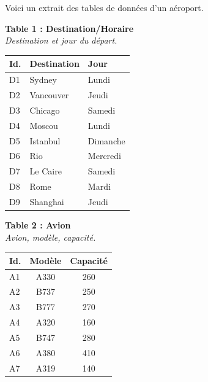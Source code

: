 \documentclass[class=report,crop=false, 12pt]{standalone}
\begin{document}
\begin{enigme}


Voici un extrait des tables de données d'un aéroport.

\bigskip

\begin{center}
{\small %

%
\begin{minipage}{0.35\textwidth}

\textbf{Table 1 : Destination/Horaire}\\
\emph{Destination et jour du départ.} \\

\begin{tabular}{|l|l|l|} \hline
\textbf{Id.} & \textbf{Destination} & \textbf{Jour} \\ \hline\hline
D1 & Sydney & Lundi \\ \hline
D2 & Vancouver & Jeudi \\ \hline
D3 & Chicago & Samedi \\ \hline
D4 & Moscou & Lundi \\ \hline
D5 & Istanbul & Dimanche \\ \hline
D6 & Rio & Mercredi \\ \hline
D7 & Le Caire & Samedi \\ \hline
D8 & Rome & Mardi \\ \hline
D9 & Shanghai & Jeudi \\ \hline
\end{tabular}
\end{minipage}
\begin{minipage}{0.3\textwidth}
\textbf{Table 2 : Avion}\\
\emph{Avion, modèle, capacité.} \\

\begin{tabular}{|l|c|c|} \hline
\textbf{Id.} & \textbf{Modèle}& \textbf{Capacité} \\ \hline\hline
A1 & A330 & 260 \\ \hline
A2 & B737 & 250 \\ \hline
A3 & B777 & 270 \\ \hline
A4 & A320 & 160 \\ \hline
A5 & B747 & 280 \\ \hline
A6 & A380 & 410 \\ \hline
A7 & A319 & 140 \\ \hline
\end{tabular}
\end{minipage}
%
\begin{minipage}{0.3\textwidth}


\end{minipage}}
\end{center}
\end{enigme}
\end{document}
